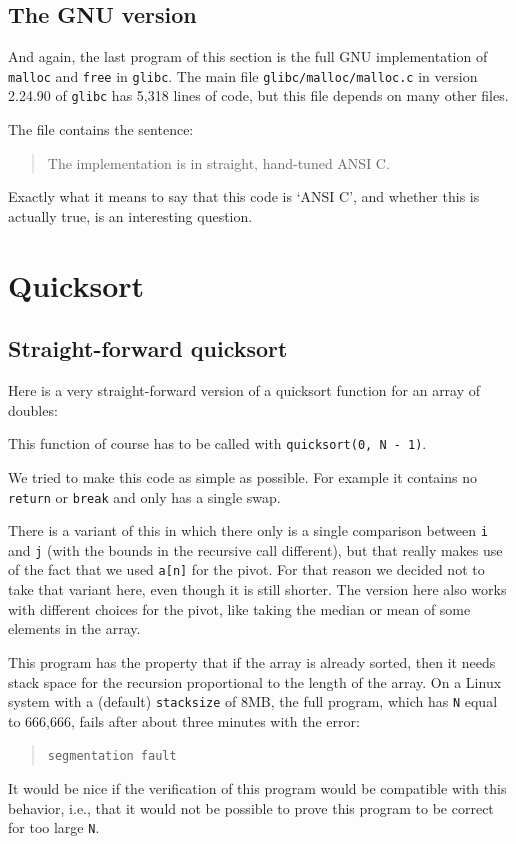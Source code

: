 \documentclass{article}
\begin{document}
\subsection{The GNU version}
And again, the last program of this section is the full GNU implementation of \texttt{malloc} and \texttt{free} in \texttt{glibc}.
The main file \lstinline|glibc/malloc/malloc.c| in version 2.24.90 of \texttt{glibc} has 5,318 lines of code, but this file depends on many other files.

The file contains the sentence:
\begin{quote}
The implementation is in straight, hand-tuned ANSI C.
\end{quote}
Exactly what it means to say that this code is `ANSI C', and whether this is actually true, is an interesting question.
\addtocounter{lstlisting}{1}

\section{Quicksort}
\subsection{Straight-forward quicksort}\label{qsort1}
Here is a very straight-forward version of a quicksort function for
an array of doubles:

This function of course has to be called with \lstinline|quicksort(0, N - 1)|.

We tried to make this code as simple as possible.
For example it contains no \lstinline|return| or \lstinline|break| and only has a single swap.

There is a variant of this in which there only is a single comparison between
\lstinline|i| and \lstinline|j| (with the bounds in the recursive
call different), but that really makes use of the fact
that we used \lstinline|a[n]| for the pivot.
For that reason we decided not to take that variant here, even though
it is still shorter.
The version here also works with different choices for the pivot,
like taking the median or mean of some elements in the array.

This program has the property that if the array is already sorted, then it needs stack space for the recursion proportional to the length of the array.
On a Linux system with a (default) \texttt{stacksize} of 8MB, the full program, which
has \texttt{N} equal to 666,666, fails after about three minutes with the error:
\begin{quote}
\lstinline|segmentation fault|
\end{quote}
It would be nice if the verification of this program would be compatible with this behavior, i.e., that it would not be possible to prove this program to be correct for too large \texttt{N}.
\end{document}
